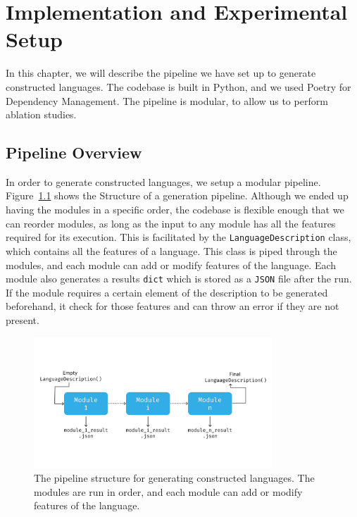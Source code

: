 \chapter{Implementation and Experimental Setup}\label{chapter:pipeline}

In this chapter, we will describe the pipeline we have set up to generate constructed languages. The codebase is built in Python, and we used Poetry
for Dependency Management. The pipeline is modular, to allow us to perform ablation studies.

\section{Pipeline Overview}
In order to generate constructed languages, we setup a modular pipeline. Figure~\ref{fig:pipeline_structure} shows the Structure of a generation pipeline.
Although we ended up having the modules in a specific order, the codebase is flexible enough that we can reorder modules, as long as the input to any module has all the features required for its execution. 
This is facilitated by the \texttt{LanguageDescription} class, which contains all the features of a language. This class is piped through the modules,
and each module can add or modify features of the language. Each module also generates a results \texttt{dict} which is stored as a \texttt{JSON} file after the run. 
If the module requires a certain element of the description to be generated beforehand, it check for those features and can throw an error if they are not present.

\begin{figure}
    \centering
    \includegraphics[width=0.8\textwidth]{figures/pipeline_structure.png}
    \caption{The pipeline structure for generating constructed languages. The modules are run in order, and each module can add or modify features of the language.}
    \label{fig:pipeline_structure}
\end{figure}

